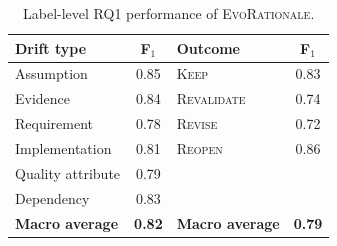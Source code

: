 \documentclass[10pt,conference]{IEEEtran}
\begin{document}
\begin{table}[!t]
\caption{Label-level RQ1 performance of \textsc{EvoRationale}.}
\label{tab:rq1-breakdown}
\centering
\scriptsize
\renewcommand{\arraystretch}{1.05}
\setlength{\tabcolsep}{3.2pt}
\begin{tabular}{@{}lclc@{}}
\toprule
\textbf{Drift type}&\textbf{F$_1$}&\textbf{Outcome}&\textbf{F$_1$}\\
\midrule
Assumption&0.85&\textsc{Keep}&0.83\\
Evidence&0.84&\textsc{Revalidate}&0.74\\
Requirement&0.78&\textsc{Revise}&0.72\\
Implementation&0.81&\textsc{Reopen}&0.86\\
Quality attribute&0.79&&\\
Dependency&0.83&&\\
\midrule
\textbf{Macro average}&\textbf{0.82}&\textbf{Macro average}&\textbf{0.79}\\
\bottomrule
\end{tabular}
\end{table}
\end{document}
